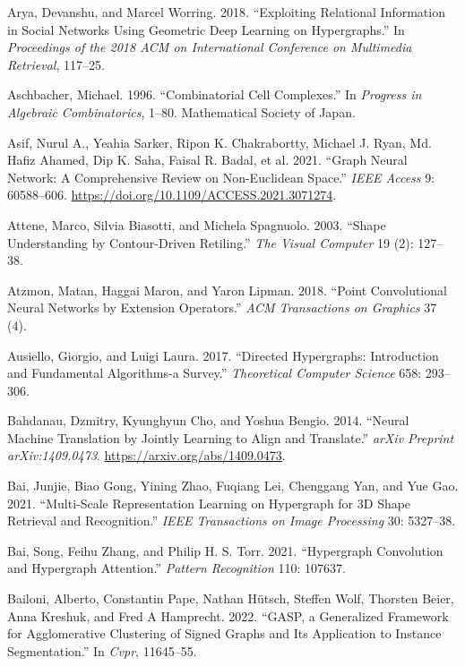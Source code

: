 \documentclass[
  12pt,
]{krantz}
\newlength{\cslhangindent}
\newenvironment{CSLReferences}[2] %
 {\begin{list}{}{%
  \setlength{\itemindent}{0pt}
  \setlength{\leftmargin}{0pt}
  \setlength{\parsep}{0pt}
  \ifodd #1
   \setlength{\leftmargin}{\cslhangindent}
   \setlength{\itemindent}{-1\cslhangindent}
  \fi
  \setlength{\itemsep}{#2\baselineskip}}}
 {\end{list}}
\begin{document}
\begin{CSLReferences}{1}{0}
Arya, Devanshu, and Marcel Worring. 2018. {``Exploiting Relational
Information in Social Networks Using Geometric Deep Learning on
Hypergraphs.''} In \emph{Proceedings of the 2018 {ACM} on
{I}nternational {C}onference on {M}ultimedia {R}etrieval}, 117--25.

Aschbacher, Michael. 1996. {``Combinatorial Cell Complexes.''} In
\emph{Progress in Algebraic Combinatorics}, 1--80. Mathematical Society
of Japan.

Asif, Nurul A., Yeahia Sarker, Ripon K. Chakrabortty, Michael J. Ryan,
Md. Hafiz Ahamed, Dip K. Saha, Faisal R. Badal, et al. 2021. {``Graph
Neural Network: A Comprehensive Review on Non-{E}uclidean Space.''}
\emph{IEEE Access} 9: 60588--606.
\url{https://doi.org/10.1109/ACCESS.2021.3071274}.

Attene, Marco, Silvia Biasotti, and Michela Spagnuolo. 2003. {``Shape
Understanding by Contour-Driven Retiling.''} \emph{The Visual Computer}
19 (2): 127--38.

Atzmon, Matan, Haggai Maron, and Yaron Lipman. 2018. {``Point
Convolutional Neural Networks by Extension Operators.''} \emph{ACM
Transactions on Graphics} 37 (4).

Ausiello, Giorgio, and Luigi Laura. 2017. {``Directed Hypergraphs:
Introduction and Fundamental Algorithms-a Survey.''} \emph{Theoretical
Computer Science} 658: 293--306.

Bahdanau, Dzmitry, Kyunghyun Cho, and Yoshua Bengio. 2014. {``Neural
Machine Translation by Jointly Learning to Align and Translate.''}
\emph{arXiv Preprint arXiv:1409.0473}.
\url{https://arxiv.org/abs/1409.0473}.

Bai, Junjie, Biao Gong, Yining Zhao, Fuqiang Lei, Chenggang Yan, and Yue
Gao. 2021. {``Multi-Scale Representation Learning on Hypergraph for 3{D}
Shape Retrieval and Recognition.''} \emph{IEEE Transactions on Image
Processing} 30: 5327--38.

Bai, Song, Feihu Zhang, and Philip H. S. Torr. 2021. {``Hypergraph
Convolution and Hypergraph Attention.''} \emph{Pattern Recognition} 110:
107637.

Bailoni, Alberto, Constantin Pape, Nathan Hütsch, Steffen Wolf, Thorsten
Beier, Anna Kreshuk, and Fred A Hamprecht. 2022. {``{GASP}, a
Generalized Framework for Agglomerative Clustering of Signed Graphs and
Its Application to Instance Segmentation.''} In \emph{Cvpr}, 11645--55.


\end{CSLReferences}
\end{document}
